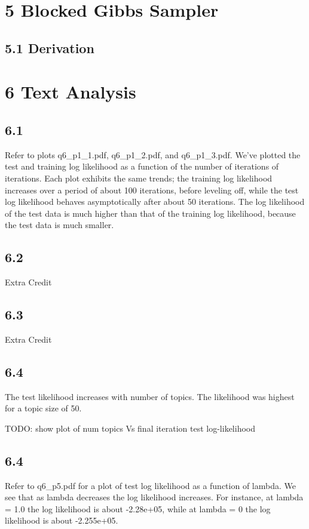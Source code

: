 \documentclass{article}
\begin{document}
\section*{5 Blocked Gibbs Sampler}
\subsection*{5.1 Derivation}

\section*{6 Text Analysis}
\subsection*{6.1}

Refer to plots q6_p1_1.pdf, q6_p1_2.pdf, and q6_p1_3.pdf. We've plotted the test and training log likelihood as a function of
the number of iterations of iterations. Each plot exhibits the same trends; the training log likelihood increases over a period
of about 100 iterations, before leveling off, while the test log likelihood behaves asymptotically after about 50 iterations. The
log likelihood of the test data is much higher than that of the training log likelihood, because the test data is much smaller.

\subsection*{6.2}

Extra Credit

\subsection*{6.3}

Extra Credit

\subsection*{6.4}
The test likelihood increases with number of topics. The likelihood was highest for a topic size of 50.

TODO: show plot of num topics Vs final iteration test log-likelihood

\subsection*{6.4}

Refer to q6_p5.pdf for a plot of test log likelihood as a function of lambda. We see that as lambda decreases the log likelihood
increases. For instance, at lambda = 1.0 the log likelihood is about -2.28e+05, while at lambda = 0 the log likelihood is about
-2.255e+05.
\end{document}
